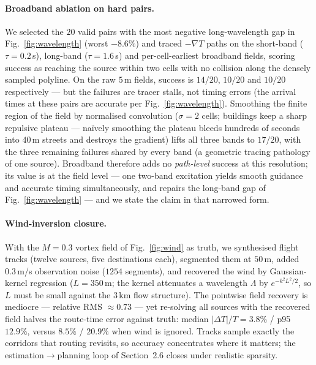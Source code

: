 \paragraph{Broadband ablation on hard pairs.}
We selected the $20$ valid pairs with the most negative
long-wavelength gap in Fig.~\ref{fig:wavelength} (worst $-8.6\%$) and
traced $-\nabla T$ paths on the short-band ($\tau=0.2\,$s),
long-band ($\tau=1.6\,$s) and per-cell-earliest broadband fields,
scoring success as reaching the source within two cells with no
collision along the densely sampled polyline. On the raw $5\,$m
fields, success is $14/20$, $10/20$ and $10/20$ respectively --- but
the failures are tracer stalls, not timing errors (the arrival times
at these pairs are accurate per Fig.~\ref{fig:wavelength}). Smoothing
the finite region of the field by normalised convolution
($\sigma = 2$ cells; buildings keep a sharp repulsive plateau ---
na\"ively smoothing the plateau bleeds hundreds of seconds into
$40\,$m streets and destroys the gradient) lifts all three bands to
$17/20$, with the three remaining failures shared by every band
(a geometric tracing pathology of one source). Broadband therefore
adds no \emph{path-level} success at this resolution; its value is at
the field level --- one two-band excitation yields smooth guidance
and accurate timing simultaneously, and repairs the long-band gap of
Fig.~\ref{fig:wavelength} --- and we state the claim in that narrowed
form.

\paragraph{Wind-inversion closure.}
With the $M=0.3$ vortex field of Fig.~\ref{fig:wind} as truth, we
synthesised flight tracks (twelve sources, five destinations each),
segmented them at $50\,$m, added $0.3\,$m/s observation noise
($1254$ segments), and recovered the wind by Gaussian-kernel
regression ($L = 350\,$m; the kernel attenuates a wavelength
$\Lambda$ by $e^{-k^2L^2/2}$, so $L$ must be small against the
$3\,$km flow structure). The pointwise field recovery is mediocre ---
relative RMS ${\approx}0.73$ --- yet re-solving all sources with the
recovered field halves the route-time error against truth: median
$|\Delta T|/T = 3.8\%$ / p95 $12.9\%$, versus $8.5\%$ / $20.9\%$ when
wind is ignored. Tracks sample exactly the corridors that routing
revisits, so accuracy concentrates where it matters; the
estimation$\to$planning loop of Section~2.6 closes under realistic
sparsity.

